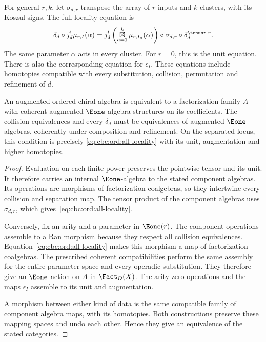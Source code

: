 For general $r,k$, let $\sigma_{d,r}$ transpose the array of
$r$ inputs and $k$ clusters, with its Koszul signs.
The full locality equation is
\begin{equation}
 \delta_d\circ j_d^!\mu_{r,I}(\alpha)
 =j_d^!\left(\mathop{\boxtimes}_{a=1}^k
          \mu_{r,I_a}(\alpha)\right)
       \circ\sigma_{d,r}\circ\delta_d^{\tensor^!r}.
 \label{eq:cbc:ord:all-locality}
\end{equation}
The same parameter $\alpha$ acts in every cluster.
For $r=0$, this is the unit equation.
There is also the corresponding equation for $\epsilon_I$.
These equations include homotopies compatible with every substitution,
collision, permutation and refinement of $d$.

\begin{theorem}
\label{cbc:ord:locality}
An augmented ordered chiral algebra is equivalent to a factorization
family $A$ with coherent augmented $\Eone$-algebra structures on its
coefficients.
The collision equivalences and every $\delta_d$ must be equivalences
of augmented $\Eone$-algebras, coherently under composition and refinement.
On the separated locus, this condition is precisely
\eqref{eq:cbc:ord:all-locality} with its unit, augmentation and
higher homotopies.
\end{theorem}
\begin{proof}
Evaluation on each finite power preserves the pointwise tensor and
its unit. It therefore carries an internal $\Eone$-algebra to the
stated component algebras.
Its operations are morphisms of factorization coalgebras, so they
intertwine every collision and separation map.
The tensor product of the component algebras uses $\sigma_{d,r}$,
which gives~\eqref{eq:cbc:ord:all-locality}.

Conversely, fix an arity and a parameter in $\Eone(r)$.
The component operations assemble to a Ran morphism because they
respect all collision equivalences.
Equation~\eqref{eq:cbc:ord:all-locality} makes this morphism a map
of factorization coalgebras.
The prescribed coherent compatibilities perform the same assembly
for the entire parameter space and every operadic substitution.
They therefore give an $\Eone$-action on $A$ in $\Fact_D(X)$.
The arity-zero operations and the maps $\epsilon_I$ assemble to its
unit and augmentation.

A morphism between either kind of data is the same compatible family
of component algebra maps, with its homotopies.
Both constructions preserve these mapping spaces and undo each other.
Hence they give an equivalence of the stated categories.
\end{proof}

